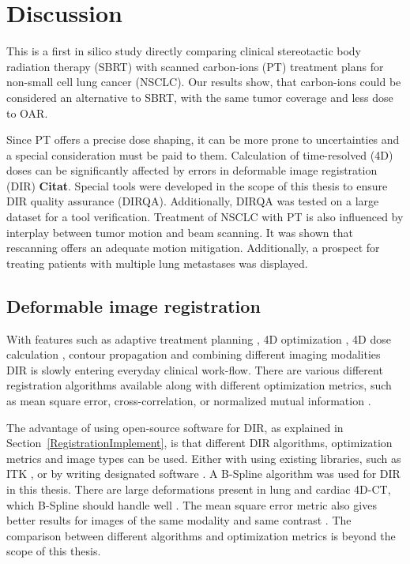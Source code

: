 \documentclass[type=dr, dr=rernat, accentcolor=tud7b,colorbacktitle, bigchapter, openright, twoside, 12pt ]{tudthesis}
\begin{document}
\chapter{Discussion}

This is a first in silico study directly comparing clinical stereotactic body radiation therapy (SBRT) with scanned carbon-ions (PT) treatment plans for non-small cell lung cancer (NSCLC). 
Our results show, that carbon-ions could be considered an alternative to SBRT, with the same tumor coverage and less dose to OAR.

Since PT offers a precise dose shaping, it can be more prone to uncertainties and a special consideration must be paid to them. Calculation of time-resolved (4D) doses can be significantly
affected by errors in deformable image registration (DIR) \textbf{Citat}. Special tools were developed in the scope of this thesis to ensure DIR quality assurance (DIRQA). Additionally, DIRQA
was tested on a large dataset for a tool verification. Treatment of NSCLC with PT is also influenced by interplay between tumor motion and beam scanning. It was shown that rescanning offers an
adequate motion mitigation. Additionally, a prospect for treating patients with multiple lung metastases was displayed.

\section{Deformable image registration}


With features such as adaptive treatment planning \cite{Yan1997}, 4D optimization \cite{Trofimov2005}, 4D dose calculation \cite{Flampouri2006}, contour propagation \cite{Lu2006b} and
combining different imaging modalities \cite{Leibfarth2013} DIR is slowly entering everyday clinical work-flow. There are various different registration algorithms available \cite{Varadhan2013}
along with different optimization metrics, such as mean square error, cross-correlation, or normalized mutual information \cite{Glocker2011}.

The advantage of using open-source software for DIR, as explained in Section~\ref{RegistrationImplement}, is that different DIR algorithms, optimization metrics and image types can be used. Either with using
existing libraries, such as ITK \cite{Yoo2002}, or by writing designated software \cite{Fedorov2015}. A B-Spline algorithm was used for DIR in this thesis. There are large deformations present in lung and cardiac
4D-CT, which B-Spline should handle well \cite{Tang2013}. The mean square error metric also gives better results for images of the same modality and same contrast \cite{Varadhan2013}. 
The comparison between different algorithms and optimization metrics is beyond the scope of this thesis.
\end{document}
